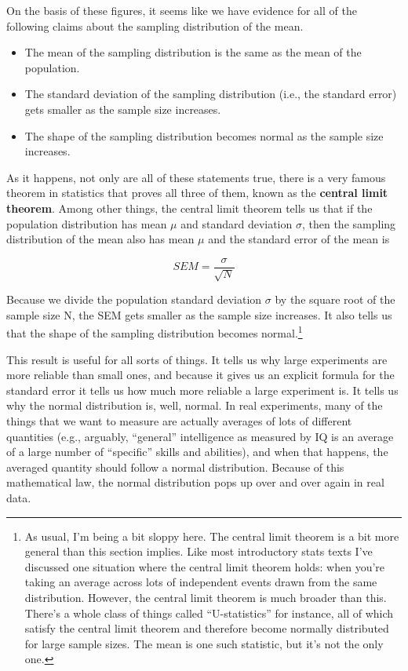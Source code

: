 \documentclass[
  a4paper,
]{book}
\providecommand{\tightlist}{%
  \setlength{\itemsep}{0pt}\setlength{\parskip}{0pt}}\usepackage{longtable,booktabs,array}
\begin{document}
On the basis of these figures, it seems like we have evidence for all of
the following claims about the sampling distribution of the mean.

\begin{itemize}
\tightlist
\item
  The mean of the sampling distribution is the same as the mean of the
  population.
\item
  The standard deviation of the sampling distribution (i.e., the
  standard error) gets smaller as the sample size increases.
\item
  The shape of the sampling distribution becomes normal as the sample
  size increases.
\end{itemize}

As it happens, not only are all of these statements true, there is a
very famous theorem in statistics that proves all three of them, known
as the \textbf{central limit theorem}. Among other things, the central
limit theorem tells us that if the population distribution has mean
\(\mu\) and standard deviation \(\sigma\), then the sampling
distribution of the mean also has mean \(\mu\) and the standard error of
the mean is

\[SEM=\frac{\sigma}{\sqrt{N}}\]

Because we divide the population standard deviation \(\sigma\) by the
square root of the sample size N, the SEM gets smaller as the sample
size increases. It also tells us that the shape of the sampling
distribution becomes normal.\footnote{As usual, I'm being a bit sloppy
  here. The central limit theorem is a bit more general than this
  section implies. Like most introductory stats texts I've discussed one
  situation where the central limit theorem holds: when you're taking an
  average across lots of independent events drawn from the same
  distribution. However, the central limit theorem is much broader than
  this. There's a whole class of things called ``U-statistics'' for
  instance, all of which satisfy the central limit theorem and therefore
  become normally distributed for large sample sizes. The mean is one
  such statistic, but it's not the only one.}

This result is useful for all sorts of things. It tells us why large
experiments are more reliable than small ones, and because it gives us
an explicit formula for the standard error it tells us how much more
reliable a large experiment is. It tells us why the normal distribution
is, well, normal. In real experiments, many of the things that we want
to measure are actually averages of lots of different quantities (e.g.,
arguably, ``general'' intelligence as measured by IQ is an average of a
large number of ``specific'' skills and abilities), and when that
happens, the averaged quantity should follow a normal distribution.
Because of this mathematical law, the normal distribution pops up over
and over again in real data.
\end{document}
